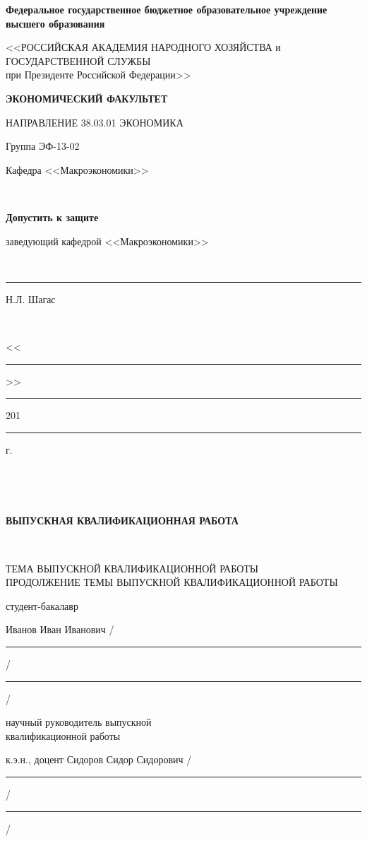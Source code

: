 \documentclass[12pt,a4paper, oneside]{extreport}
\begin{document}
\thispagestyle{empty} %

\begin{center}
\small \bfseries Федеральное государственное бюджетное образовательное учреждение высшего образования

<<РОССИЙСКАЯ АКАДЕМИЯ НАРОДНОГО ХОЗЯЙСТВА и\\ ГОСУДАРСТВЕННОЙ СЛУЖБЫ \\
при Президенте Российской Федерации>>

\vspace{2ex}

\bfseries
ЭКОНОМИЧЕСКИЙ ФАКУЛЬТЕТ

НАПРАВЛЕНИЕ 38.03.01 ЭКОНОМИКА
\end{center}

\vfill


\noindent  Группа ЭФ-13-02
\hfill
\parbox[t]{20em}{\centering
Кафедра <<Макроэкономики>>

\mbox{ }

\textbf{Допустить к защите}

заведующий кафедрой <<Макроэкономики>>

\mbox{ }

\rule{8em}{0.5pt} Н.Л. Шагас

\mbox{ }

<<\rule{2em}{0.5pt}>> \rule{5em}{0.5pt} 201\rule{1em}{0.5pt} г. }

\mbox{ }

\mbox{ }

\begin{center}\bfseries
ВЫПУСКНАЯ КВАЛИФИКАЦИОННАЯ РАБОТА

\mbox{ }

\large
ТЕМА ВЫПУСКНОЙ КВАЛИФИКАЦИОННОЙ РАБОТЫ \\
ПРОДОЛЖЕНИЕ ТЕМЫ ВЫПУСКНОЙ КВАЛИФИКАЦИОННОЙ РАБОТЫ
\end{center}

\vfill

\noindent\normalsize
студент-бакалавр

\noindent
Иванов Иван Иванович
\hfill /\rule{6em}{0.5pt}/\rule{6em}{0.5pt}/

\hfill{}

\noindent
научный руководитель выпускной \\
квалификационной работы

\noindent
к.э.н., доцент Сидоров Сидор Сидорович
\hfill /\rule{6em}{0.5pt}/\rule{6em}{0.5pt}/
\end{document}

